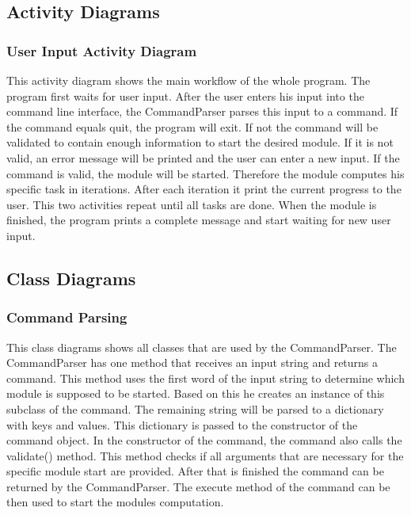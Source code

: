 \documentclass[parskip=full]{scrartcl}
\begin{document}
\subsection{Activity Diagrams}

\subsubsection{User Input Activity Diagram}



This activity diagram shows the main workflow of the whole program.
The program first waits for user input.
After the user enters his input into the command line interface, the CommandParser parses this input to a command.
If the command equals quit, the program will exit.
If not the command will be validated to contain enough information to start the desired module.
If it is not valid, an error message will be printed and the user can enter a new input.
If the command is valid, the module will be started.
Therefore the module computes his specific task in iterations.
After each iteration it print the current progress to the user.
This two activities repeat until all tasks are done.
When the module is finished, the program prints a complete message and start waiting for new user input.

\subsection{Class Diagrams}

\subsubsection{Command Parsing}



This class diagrams shows all classes that are used by the CommandParser.
The CommandParser has one method that receives an input string and returns a command.
This method uses the first word of the input string to determine which module is supposed to be started.
Based on this he creates an instance of this subclass of the command.
The remaining string will be parsed to a dictionary with keys and values. 
This dictionary is passed to the constructor of the command object.
In the constructor of the command, the command also calls the validate() method.
This method checks if all arguments that are necessary for the specific module start are provided.
After that is finished the command can be returned by the CommandParser.
The execute method of the command can be then used to start the modules computation.
\end{document}
